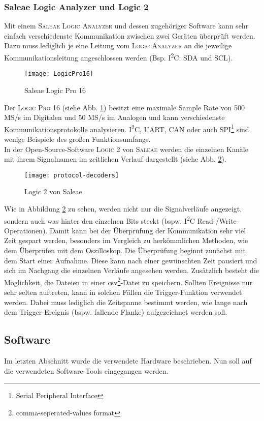 \documentclass[
	letterpaper, %
	10pt, %
]{CSUniSchoolLabReport}
\begin{document}
\begin{spacing}{1.6}
\newpage
\subsubsection{Saleae Logic Analyzer und Logic 2}
Mit einem \textsc{Saleae Logic Analyzer} und dessen zugehöriger Software kann sehr einfach verschiedenste Kommunikation zwischen zwei Geräten überprüft werden. Dazu muss lediglich je eine Leitung vom \textsc{Logic Analyzer} an die jeweilige Kommunikationsleitung angeschlossen werden (Bsp. I\textsuperscript{2}C: SDA und SCL). 
\begin{figure}[H]
    \centering
    \texttt{[image: LogicPro16]}
    \caption{Saleae Logic Pro 16 \cite{saleae}}
    \label{fig:LogicPro16}
\end{figure}
Der \textsc{Logic Pro 16} (siehe Abb. \ref{fig:LogicPro16}) besitzt eine maximale Sample Rate von 500 MS/s im Digitalen und 50 MS/s im Analogen und kann verschiedenste Kommunikationsprotokolle analysieren. I\textsuperscript{2}C, UART, CAN oder auch SPI\footnote{Serial Peripheral Interface} sind wenige Beispiele des großen Funktionsumfangs.\\
In der Open-Source-Software \textsc{Logic 2} von \textsc{Saleae} werden die einzelnen Kanäle mit ihrem Signalnamen im zeitlichen Verlauf dargestellt (siehe Abb. \ref{fig:Logic2}).
\begin{figure}[H]
    \centering
    \texttt{[image: protocol-decoders]}
    \caption{Logic 2 von Saleae \cite{Logic2}}
    \label{fig:Logic2}
\end{figure}
Wie in Abbildung \ref{fig:Logic2} zu sehen, werden nicht nur die Signalverläufe angezeigt, sondern auch was hinter den einzelnen Bits steckt (bspw. I\textsuperscript{2}C Read-/Write-Operationen). Damit kann bei der Überprüfung der Kommunikation sehr viel Zeit gespart werden, besonders im Vergleich zu herkömmlichen Methoden, wie dem Überprüfen mit dem Oszilloskop.
Die Überprüfung beginnt zunächst mit dem Start einer Aufnahme. Diese kann nach einer gewünschten Zeit pausiert und sich im Nachgang die einzelnen Verläufe angesehen werden. Zusätzlich besteht die Möglichkeit, die Dateien in einer csv\footnote{comma-seperated-values format}-Datei zu speichern. Sollten Ereignisse nur sehr selten auftreten, kann in solchen Fällen die Trigger-Funktion verwendet werden. Dabei muss lediglich die Zeitspanne bestimmt werden, wie lange nach dem Trigger-Ereignis (bspw. fallende Flanke) aufgezeichnet werden soll.


\subsection{Software}
Im letzten Abschnitt wurde die verwendete Hardware beschrieben. Nun soll auf die verwendeten Software-Tools eingegangen werden.

\end{spacing}
\end{document}
